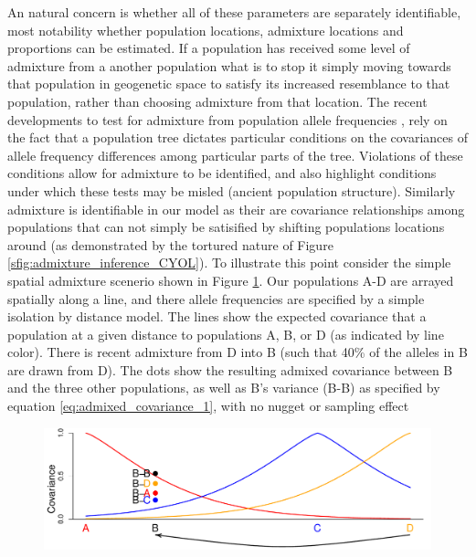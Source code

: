 \documentclass[12pt]{article}
\begin{document}
An natural concern is whether all of these parameters are separately identifiable, most notability whether population locations, admixture locations and proportions can be estimated. If a population has received some level of admixture from a another population what is to stop it simply moving towards that population in geogenetic space to satisfy its increased resemblance to that population, rather than choosing admixture from that location. The recent developments to test for admixture from population allele frequencies \citep{treemix}, rely on the fact that a population tree dictates particular conditions on the covariances of allele frequency differences among particular parts of the tree. Violations of these conditions allow for admixture to be identified, and also highlight conditions under which these tests may be misled (ancient population structure). Similarly admixture is identifiable in our model as their are covariance relationships among populations that can not simply be satisified by shifting populations locations around (as demonstrated by the tortured nature of Figure \ref{sfig:admixture_inference_CYOL}). To illustrate this point consider the simple spatial admixture scenerio shown in Figure \ref{fig:toy_admixture}. Our populations A-D are arrayed spatially along a line, and there allele frequencies are specified by a simple isolation by distance model. The lines show the expected covariance that a population at a given distance to populations A, B, or D (as indicated by line color). There is recent admixture from D into B (such that 40\% of the alleles in B are drawn from D). The dots show the resulting admixed covariance between B and the three other populations, as well as B's variance (B-B) as specified by equation \eqref{eq:admixed_covariance_1}, with no nugget or sampling effect
\begin{figure}[ht!]
	\centering
	\includegraphics[width=\textwidth]{figs/sims/Admix_covar_toy_fig.pdf}
	\caption{} \label{fig:toy_admixture}
\end{figure}
\end{document}

